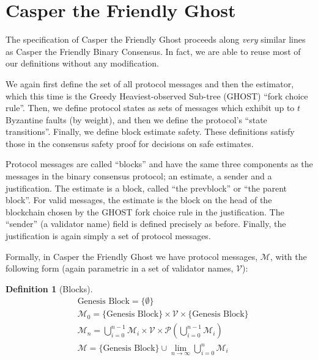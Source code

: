 \documentclass{article}
\theoremstyle{definition}
\newtheorem{defn}{Definition}[section]
\begin{document}
\section{Casper the Friendly Ghost}

The specification of Casper the Friendly Ghost proceeds along \emph{very} similar lines as Casper the Friendly Binary Consensus. In fact, we are able to reuse most of our definitions without any modification.

We again first define the set of all protocol messages and then the estimator, which this time is the Greedy Heaviest-observed Sub-tree (GHOST) ``fork choice rule''. Then, we define protocol states as sets of messages which exhibit up to $t$ Byzantine faults (by weight), and then we define the protocol's ``state transitions''. Finally, we define block estimate safety. These definitions satisfy those in the consensus safety proof for decisions on safe estimates.

Protocol messages are called ``blocks'' and have the same three components as the messages in the binary consensus protocol; an estimate, a sender and a justification. The estimate is a block, called ``the prevblock'' or ``the parent block''. For valid messages, the estimate is the block on the head of the blockchain chosen by the GHOST fork choice rule in the justification. The ``sender'' (a validator name) field is defined precisely as before. Finally, the justification is again simply a set of protocol messages.

Formally, in Casper the Friendly Ghost we have protocol messages, $\mathcal{M}$, with the following form (again parametric in a set of validator names, $\mathcal{V}$):


\begin{defn}[Blocks]
\begin{equation*}
\begin{split}
  &\text{Genesis Block} = \{\emptyset\}\\
    &\mathcal{M}_0 = \{\text{Genesis Block}\} \times \mathcal{V} \times \{\text{Genesis Block}\}\\
    &\mathcal{M}_n = \bigcup_{i=0}^{n-1} \mathcal{M}_i \times \mathcal{V} \times \mathcal{P}(\bigcup_{i=0}^{n-1} \mathcal{M}_i)\\
    &\mathcal{M} = \{\text{Genesis Block}\} \cup \lim_{n \to \infty} \bigcup_{i=0}^{n} \mathcal{M}_i
\end{split}
\end{equation*}
\end{defn}
\end{document}
